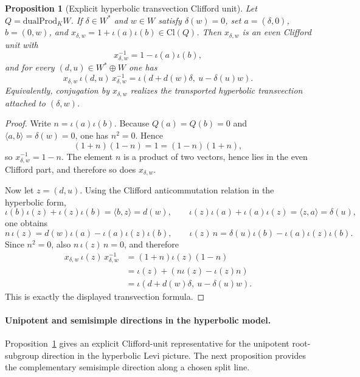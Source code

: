 \documentclass{birkjour}
\theoremstyle{plain}
\newtheorem{proposition}[theorem]{Proposition}
\theoremstyle{definition}
\theoremstyle{remark}
\newcommand{\Cl}{\mathrm{Cl}}
\newcommand{\dualProd}{\mathrm{dualProd}}
\begin{document}
\begin{proposition}[Explicit hyperbolic transvection Clifford unit]
\label{prop:transvection-unit}
Let $Q=\dualProd_K W$. If $\delta\in W^*$ and $w\in W$ satisfy $\delta(w)=0$,
set \(a=(\delta,0)\), \(b=(0,w)\), and
\(x_{\delta,w}=1+\iota(a)\iota(b)\in \Cl(Q)\).
Then $x_{\delta,w}$ is an even Clifford unit with
\[
  x_{\delta,w}^{-1}=1-\iota(a)\iota(b),
\]
and for every $(d,u)\in W^*\oplus W$ one has
\[
  x_{\delta,w}\,\iota(d,u)\,x_{\delta,w}^{-1}
  =
  \iota(d+d(w)\delta,\ u-\delta(u)w).
\]
Equivalently, conjugation by $x_{\delta,w}$ realizes the transported hyperbolic
transvection attached to $(\delta,w)$.
\end{proposition}

\begin{proof}
Write $n=\iota(a)\iota(b)$. Because $Q(a)=Q(b)=0$ and
$\langle a,b\rangle=\delta(w)=0$, one has $n^2=0$. Hence
\[
  (1+n)(1-n)=1=(1-n)(1+n),
\]
so $x_{\delta,w}^{-1}=1-n$. The element $n$ is a product of two vectors, hence
lies in the even Clifford part, and therefore so does $x_{\delta,w}$.

Now let $z=(d,u)$. Using the Clifford anticommutation relation in the
hyperbolic form,
\[
  \iota(b)\iota(z)+\iota(z)\iota(b)=\langle b,z\rangle=d(w),
  \qquad
  \iota(z)\iota(a)+\iota(a)\iota(z)=\langle z,a\rangle=\delta(u),
\]
one obtains
\[
  n\,\iota(z)=d(w)\iota(a)-\iota(a)\iota(z)\iota(b),
  \qquad
  \iota(z)\,n=\delta(u)\iota(b)-\iota(a)\iota(z)\iota(b).
\]
Since $n^2=0$, also $n\,\iota(z)\,n=0$, and therefore
\[
  \begin{aligned}
  x_{\delta,w}\,\iota(z)\,x_{\delta,w}^{-1}
    &= (1+n)\iota(z)(1-n) \\
    &= \iota(z)+(n\iota(z)-\iota(z)n) \\
    &= \iota(d+d(w)\delta,\ u-\delta(u)w).
  \end{aligned}
\]
This is exactly the displayed transvection formula.
\end{proof}

\paragraph{Unipotent and semisimple directions in the hyperbolic model.}
Proposition~{}\ref{prop:transvection-unit} gives an explicit Clifford-unit
representative for the unipotent root-subgroup direction in the hyperbolic Levi
picture. The next proposition provides the complementary semisimple direction
along a chosen split line.
\end{document}
